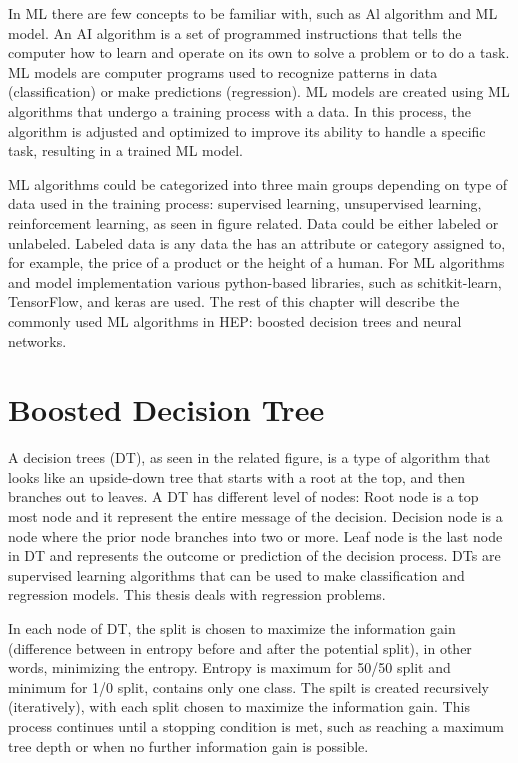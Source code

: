 In ML there are few concepts to be familiar with, such as Al algorithm and ML model.
An AI algorithm is a set of programmed instructions that tells the computer how to learn and operate on its own %
to solve a problem or to do a task.
ML models are computer programs used to recognize patterns in data (classification) or make predictions (regression).
ML models are created using ML algorithms that undergo a training process with a data.
In this process, the algorithm is adjusted and optimized to improve its ability to handle a specific task, resulting in a trained ML model.

ML algorithms could be categorized into three main groups depending on type of data used in the training process: supervised learning, unsupervised learning, reinforcement learning, as seen in figure related. %
Data could be either labeled or unlabeled.
Labeled data is any data the has an attribute or category assigned to, for example, the price of a product or the height of a human.
For ML algorithms and model implementation various python-based libraries, such as schitkit-learn, TensorFlow, and keras are used.
The rest of this chapter will describe the commonly used ML algorithms in HEP: %
boosted decision trees and neural networks.

\section{Boosted Decision Tree}
A decision trees (DT), as seen in the related figure, is a type of algorithm that looks like an upside-down tree that starts with a root at the top, and then branches out to leaves.
A DT has different level of nodes: Root node is a top most node and it represent the entire message of the decision.
Decision node is a node where the prior node branches into two or more.
Leaf node is the last node in DT and represents the outcome or prediction of the decision process.
DTs are supervised learning algorithms that can be used to make classification and regression models.
This thesis deals with regression problems.

In each node of DT, the split is chosen to maximize the information gain (difference between in entropy before and after the potential split), in other words, minimizing the entropy.
Entropy is maximum for 50/50 split and minimum for 1/0 split, \ie contains only one class.
The spilt is created recursively (iteratively), with each split chosen to maximize the information gain.
This process continues until a stopping condition is met, such as reaching a maximum tree depth or when no further information gain is possible.

